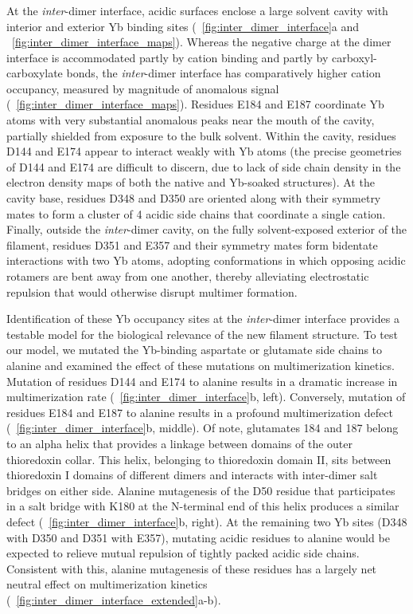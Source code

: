 \subsubsection{\headingsubsubsectionfive}
% 
At the \textit{inter}-dimer interface, acidic surfaces enclose a large solvent cavity with interior and exterior Yb binding sites (\maintextfigure~\ref{fig:inter_dimer_interface}a and \extendeddatafigure~\ref{fig:inter_dimer_interface_maps}). Whereas the negative charge at the dimer interface is accommodated partly by cation binding and partly by carboxyl-carboxylate bonds, the \textit{inter}-dimer interface has comparatively higher cation occupancy, measured by magnitude of anomalous signal (\extendeddatafigure~\ref{fig:inter_dimer_interface_maps}). Residues E184 and E187 coordinate Yb atoms with very substantial anomalous peaks near the mouth of the cavity, partially shielded from exposure to the bulk solvent. Within the cavity, residues D144 and E174 appear to interact weakly with Yb atoms (the precise geometries of D144 and E174 are difficult to discern, due to lack of side chain density in the electron density maps of both the native and Yb-soaked structures). At the cavity base, residues D348 and D350 are oriented along with their symmetry mates to form a cluster of 4 acidic side chains that coordinate a single cation. Finally, outside the \textit{inter}-dimer cavity, on the fully solvent-exposed exterior of the filament, residues D351 and E357 and their symmetry mates form bidentate interactions with two Yb atoms, adopting conformations in which opposing acidic rotamers are bent away from one another, thereby alleviating electrostatic repulsion that would otherwise disrupt multimer formation.

Identification of these Yb occupancy sites at the \textit{inter}-dimer interface provides a testable model for the biological relevance of the new filament structure. To test our model, we mutated the Yb-binding aspartate or glutamate side chains to alanine and examined the effect of these mutations on multimerization kinetics. Mutation of residues D144 and E174 to alanine results in a dramatic increase in multimerization rate (\maintextfigure~\ref{fig:inter_dimer_interface}b, left). Conversely, mutation of residues E184 and E187 to alanine results in a profound multimerization defect (\maintextfigure~\ref{fig:inter_dimer_interface}b, middle). Of note, glutamates 184 and 187 belong to an alpha helix that provides a linkage between domains of the outer thioredoxin collar. This helix, belonging to thioredoxin domain II, sits between thioredoxin I domains of different dimers and interacts with inter-dimer salt bridges on either side. Alanine mutagenesis of the D50 residue that participates in a salt bridge with K180 at the N-terminal end of this helix produces a similar defect (\maintextfigure~\ref{fig:inter_dimer_interface}b, right). At the remaining two Yb sites (D348 with D350 and D351 with E357), mutating acidic residues to alanine would be expected to relieve mutual repulsion of tightly packed acidic side chains. Consistent with this, alanine mutagenesis of these residues has a largely net neutral effect on multimerization kinetics (\extendeddatafigure~\ref{fig:inter_dimer_interface_extended}a-b). 


